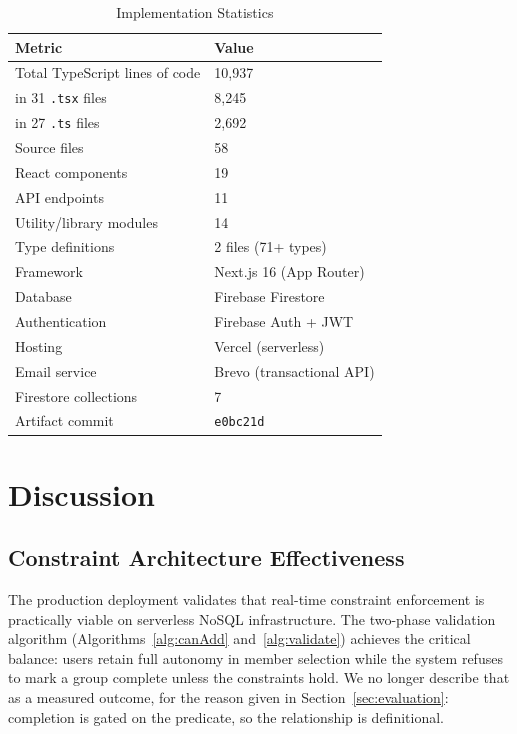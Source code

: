 \documentclass[11pt,a4paper]{article}
\theoremstyle{plain}
\theoremstyle{definition}
\theoremstyle{remark}
\begin{document}
\begin{table}[htbp]
\centering
\caption{Implementation Statistics}
\label{tab:metrics}
\small
\renewcommand{\arraystretch}{1.15}
\begin{tabular}{@{}ll@{}}
\toprule
\textbf{Metric} & \textbf{Value} \\
\midrule
Total TypeScript lines of code & 10,937 \\
\quad in 31 \texttt{.tsx} files & 8,245 \\
\quad in 27 \texttt{.ts} files & 2,692 \\
Source files & 58 \\
React components & 19 \\
API endpoints & 11 \\
Utility/library modules & 14 \\
Type definitions & 2 files (71+ types) \\
Framework & Next.js 16 (App Router) \\
Database & Firebase Firestore \\
Authentication & Firebase Auth + JWT \\
Hosting & Vercel (serverless) \\
Email service & Brevo (transactional API) \\
Firestore collections & 7 \\
Artifact commit & \texttt{e0bc21d} \\
\bottomrule
\end{tabular}
\end{table}

\section{Discussion}
\label{sec:discussion}

\subsection{Constraint Architecture Effectiveness}

The production deployment validates that real-time constraint enforcement is practically viable on serverless NoSQL infrastructure. The two-phase validation algorithm (Algorithms~\ref{alg:canAdd} and~\ref{alg:validate}) achieves the critical balance: users retain full autonomy in member selection while the system refuses to mark a group complete unless the constraints hold. We no longer describe that as a measured outcome, for the reason given in Section~\ref{sec:evaluation}: completion is gated on the predicate, so the relationship is definitional.
\end{document}
